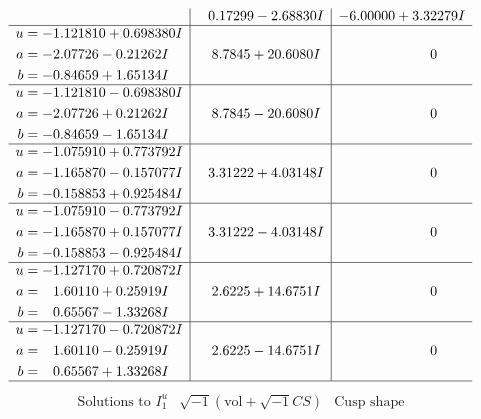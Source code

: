 \documentclass[1p]{elsarticle_modified}
\theoremstyle{definition}
\newcommand{\I}{\sqrt{-1}}
\begin{document}
$$\begin{array}{c|c|c}
 & \phantom{-}0.17299 - 2.68830 I & -6.00000 + 3.32279 I \\ \hline\begin{aligned}
u &= -1.121810 + 0.698380 I \\
a &= -2.07726 - 0.21262 I \\
b &= -0.84659 + 1.65134 I\end{aligned}
 & \phantom{-}8.7845 + 20.6080 I & \phantom{-0.000000 } 0 \\ \hline\begin{aligned}
u &= -1.121810 - 0.698380 I \\
a &= -2.07726 + 0.21262 I \\
b &= -0.84659 - 1.65134 I\end{aligned}
 & \phantom{-}8.7845 - 20.6080 I & \phantom{-0.000000 } 0 \\ \hline\begin{aligned}
u &= -1.075910 + 0.773792 I \\
a &= -1.165870 - 0.157077 I \\
b &= -0.158853 + 0.925484 I\end{aligned}
 & \phantom{-}3.31222 + 4.03148 I & \phantom{-0.000000 } 0 \\ \hline\begin{aligned}
u &= -1.075910 - 0.773792 I \\
a &= -1.165870 + 0.157077 I \\
b &= -0.158853 - 0.925484 I\end{aligned}
 & \phantom{-}3.31222 - 4.03148 I & \phantom{-0.000000 } 0 \\ \hline\begin{aligned}
u &= -1.127170 + 0.720872 I \\
a &= \phantom{-}1.60110 + 0.25919 I \\
b &= \phantom{-}0.65567 - 1.33268 I\end{aligned}
 & \phantom{-}2.6225 + 14.6751 I & \phantom{-0.000000 } 0 \\ \hline\begin{aligned}
u &= -1.127170 - 0.720872 I \\
a &= \phantom{-}1.60110 - 0.25919 I \\
b &= \phantom{-}0.65567 + 1.33268 I\end{aligned}
 & \phantom{-}2.6225 - 14.6751 I & \phantom{-0.000000 } 0\\
 \hline 
 \end{array}$$\newpage$$\begin{array}{c|c|c}  
\text{Solutions to }I^u_{1}& \I (\text{vol} + \sqrt{-1}CS) & \text{Cusp shape}\\

\end{array}$$
\end{document}
